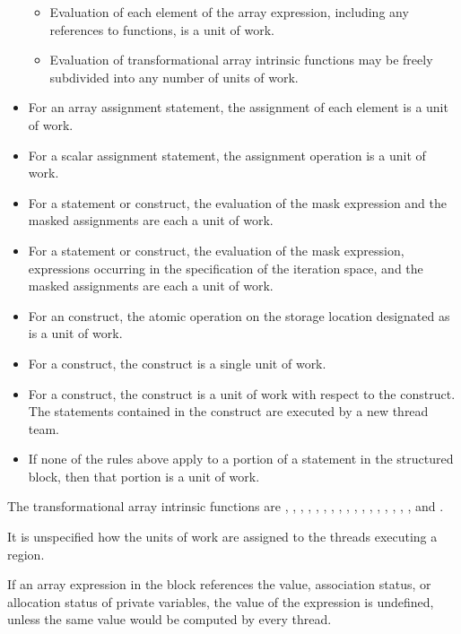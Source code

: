 \begin{fortranspecific}
\begin{itemize}
\begin{itemize}
\item Evaluation of each element of the array expression, including any 
      references to  functions, is a unit of work.
\item Evaluation of transformational array intrinsic functions may be freely
      subdivided into any number of units of work.
\end{itemize}

\item For an array assignment statement, the assignment of each element is 
      a unit of work.
\item For a scalar assignment statement, the assignment operation is a unit of work.
\item For a  statement or construct, the evaluation of the mask 
      expression and the masked assignments are each a unit of work.
\item For a  statement or construct, the evaluation of the mask 
      expression, expressions occurring in the specification of the iteration 
      space, and the masked assignments are each a unit of work.
\item For an  construct, the atomic operation on the storage 
      location designated as  is a unit of work.
\item For a  construct, the construct is a single unit of work.
\item For a  construct, the construct is a unit of work with 
      respect to the  construct. The statements contained in 
      the  construct are executed by a new thread team.
\item If none of the rules above apply to a portion of a statement in the 
      structured block, then that portion is a unit of work.
\end{itemize}

The transformational array intrinsic functions are , ,
, , , , ,
, , , , ,
, , , , 
, and .

It is unspecified how the units of work are assigned to the threads executing a
 region.

If an array expression in the block references the value, association status, or 
allocation status of private variables, the value of the expression is undefined, 
unless the same value would be computed by every thread.


\end{fortranspecific}

